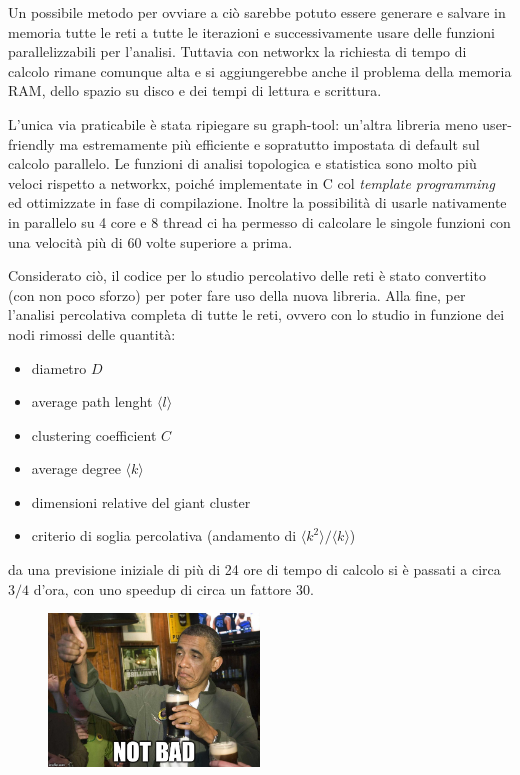 Un possibile metodo per ovviare a ciò sarebbe potuto essere generare e salvare in memoria tutte le reti a tutte le iterazioni e successivamente usare delle funzioni parallelizzabili per l'analisi. Tuttavia con networkx la richiesta di tempo di calcolo rimane comunque alta e si aggiungerebbe anche il problema della memoria RAM, dello spazio su disco e dei tempi di lettura e scrittura.

L'unica via praticabile è stata ripiegare su graph-tool: un'altra libreria meno user-friendly ma estremamente più efficiente e sopratutto impostata di default sul calcolo parallelo. Le funzioni di analisi topologica e statistica sono molto più veloci rispetto a networkx, poiché implementate in C col \emph{template programming} ed ottimizzate in fase di compilazione. Inoltre la possibilità di usarle nativamente in parallelo su 4 core e 8 thread ci ha permesso di calcolare le singole funzioni con una velocità più di 60 volte superiore a prima.

Considerato ciò, il codice per lo studio percolativo delle reti è stato convertito (con non poco sforzo) per poter fare uso della nuova libreria. Alla fine, per l'analisi percolativa completa di tutte le reti, ovvero con lo studio in funzione dei nodi rimossi delle quantità:

\begin{itemize}
 \item   diametro $D$
 \item   average path lenght $\langle l \rangle$
 \item   clustering coefficient $C$
 \item   average degree $\langle k \rangle$
 \item   dimensioni relative del giant cluster
 \item   criterio di soglia percolativa (andamento di $\langle k^2 \rangle / \langle k \rangle$)
\end{itemize}

da una previsione iniziale di più di 24 ore di tempo di calcolo si è passati a circa $3/4$ d'ora, con uno speedup di circa un fattore 30.

\begin{figure}[h!]
	\centering
	\includegraphics[width=0.5\textwidth]{./Immagini/Attack/meme_Obama.jpg}
\end{figure}

